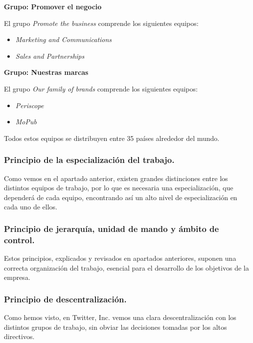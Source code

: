 \textbf{Grupo: Promover el negocio}

El grupo \textit{Promote the business} comprende los siguientes equipos:

\begin{itemize}

\item \textit{Marketing and Communications}
\item \textit{Sales and Partnerships}

\end{itemize}

\textbf{Grupo: Nuestras marcas}

El grupo \textit{Our family of brands} comprende los siguientes equipos:

\begin{itemize}

\item \textit{Periscope}
\item \textit{MoPub}

\end{itemize}


Todos estos equipos se distribuyen entre 35 países alrededor del mundo.

\subsubsection{Principio de la especialización del trabajo.}

Como vemos en el apartado anterior, existen grandes distinciones entre los distintos equipos de trabajo, por lo que es necesaria una especialización, que dependerá de cada equipo, encontrando así un alto nivel de especialización en cada uno de ellos.

\subsubsection{Principio de jerarquía, unidad de mando y ámbito de control.}

Estos principios, explicados y revisados en apartados anteriores, suponen una correcta organización del trabajo, esencial para el desarrollo de los objetivos de la empresa.

\subsubsection{Principio de descentralización.}

Como hemos visto, en Twitter, Inc. vemos una clara descentralización con los distintos grupos de trabajo, sin obviar las decisiones tomadas por los altos directivos.